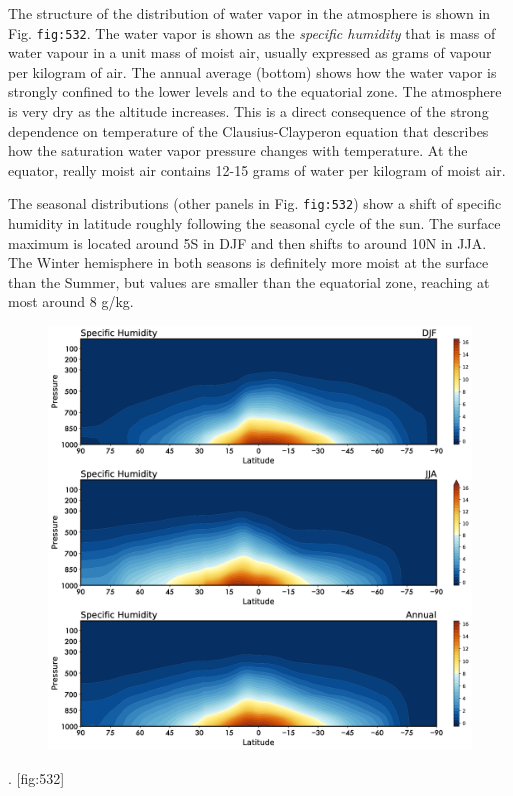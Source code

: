 The structure of the distribution of water vapor in the atmosphere is
shown in Fig. \texttt{fig:532}. The water vapor is shown as the
\emph{specific humidity} that is mass of water vapour in a unit mass of
moist air, usually expressed as grams of vapour per kilogram of air. The
annual average (bottom) shows how the water vapor is strongly confined
to the lower levels and to the equatorial zone. The atmosphere is very
dry as the altitude increases. This is a direct consequence of the
strong dependence on temperature of the Clausius-Clayperon equation that
describes how the saturation water vapor pressure changes with
temperature. At the equator, really moist air contains 12-15 grams of
water per kilogram of moist air.

The seasonal distributions (other panels in Fig. \texttt{fig:532}) show
a shift of specific humidity in latitude roughly following the seasonal
cycle of the sun. The surface maximum is located around 5S in DJF and
then shifts to around 10N in JJA. The Winter hemisphere in both seasons
is definitely more moist at the surface than the Summer, but values are
smaller than the equatorial zone, reaching at most around 8 g/kg.

\begin{figure}
\centering
\includegraphics[width = .7 \textwidth]{figs/GD/Qzonal.png}
\caption{}\label{}
\end{figure}

. {[}fig:532{]}

